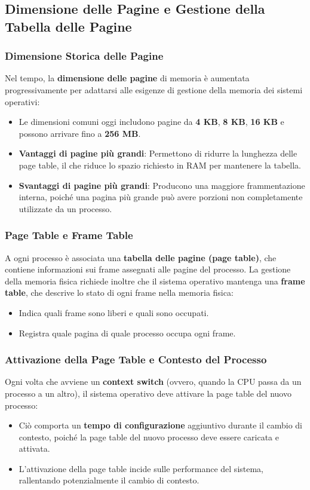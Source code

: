 \subsection{Dimensione delle Pagine e Gestione della Tabella delle Pagine}

\subsubsection{Dimensione Storica delle Pagine}
Nel tempo, la \textbf{dimensione delle pagine} di memoria è aumentata progressivamente per adattarsi alle esigenze di gestione della memoria dei sistemi operativi:
\begin{itemize}
    \item Le dimensioni comuni oggi includono pagine da \textbf{4 KB}, \textbf{8 KB}, \textbf{16 KB} e possono arrivare fino a \textbf{256 MB}.
    \item \textbf{Vantaggi di pagine più grandi}: Permettono di ridurre la lunghezza delle page table, il che riduce lo spazio richiesto in RAM per mantenere la tabella. 
    \item \textbf{Svantaggi di pagine più grandi}: Producono una maggiore frammentazione interna, poiché una pagina più grande può avere porzioni non completamente utilizzate da un processo.
\end{itemize}

\subsubsection*{Page Table e Frame Table}
A ogni processo è associata una \textbf{tabella delle pagine (page table)}, che contiene informazioni sui frame assegnati alle pagine del processo. La gestione della memoria fisica richiede inoltre che il sistema operativo mantenga una \textbf{frame table}, che descrive lo stato di ogni frame nella memoria fisica:
\begin{itemize}
    \item Indica quali frame sono liberi e quali sono occupati.
    \item Registra quale pagina di quale processo occupa ogni frame.
\end{itemize}

\subsubsection*{Attivazione della Page Table e Contesto del Processo}
Ogni volta che avviene un \textbf{context switch} (ovvero, quando la CPU passa da un processo a un altro), il sistema operativo deve attivare la page table del nuovo processo:
\begin{itemize}
    \item Ciò comporta un \textbf{tempo di configurazione} aggiuntivo durante il cambio di contesto, poiché la page table del nuovo processo deve essere caricata e attivata.
    \item L’attivazione della page table incide sulle performance del sistema, rallentando potenzialmente il cambio di contesto.
\end{itemize}


